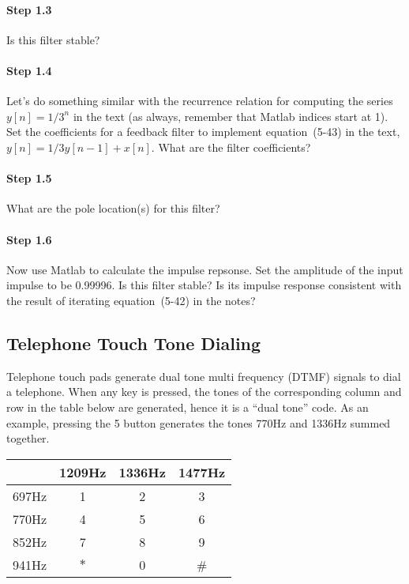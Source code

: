 \paragraph{Step 1.3} Is this filter stable?


\paragraph{Step 1.4} Let's do something similar with the recurrence
relation for computing the series $y[n] = 1/3^n$ in the text (as
always, remember that Matlab indices start at 1). Set the
coefficients for a feedback filter to implement equation~(5-43) in the
text, $y[n] = 1/3 y[n-1] + x[n]$. What are the filter coefficients?


\paragraph{Step 1.5} What are the pole location(s) for this filter?


\paragraph{Step 1.6} Now use Matlab to calculate the impulse repsonse.
Set the amplitude of the input impulse to be 0.99996. Is this filter
stable?  Is its impulse response consistent with the result of
iterating equation~(5-42) in the notes?


\subsection{Telephone Touch Tone Dialing}
Telephone touch pads generate dual tone multi frequency (DTMF) signals
to dial a telephone. When any key is pressed, the tones of the
corresponding column and row in the table below are generated, hence
it is a ``dual tone'' code. As an example, pressing the 5 button
generates the tones 770Hz and 1336Hz summed together.

\begin{center}
  \begin{tabular}{l|ccc}
    & 1209Hz & 1336Hz & 1477Hz \\ \hline
    697Hz &   1    &   2    &   3    \\
    770Hz &   4    &   5    &   6    \\
    852Hz &   7    &   8    &   9    \\
    941Hz &   $\ast $    &   0    &   \#    
  \end{tabular}
\end{center}

